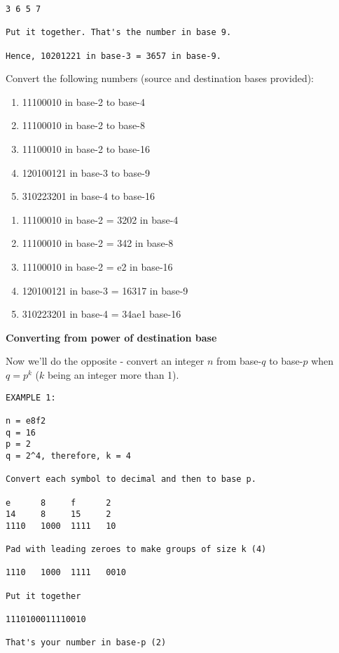 \begin{questions}
\begin{verbatim}
3 6 5 7

Put it together. That's the number in base 9.

Hence, 10201221 in base-3 = 3657 in base-9.
\end{verbatim}


Convert the following numbers (source and destination bases provided):

\begin{enumerate}
\item 11100010 in base-2 to base-4	
\item 11100010 in base-2 to base-8
\item 11100010 in base-2 to base-16	
\item 120100121 in base-3 to base-9
\item 310223201 in base-4 to base-16
\end{enumerate}

\begin{solution}
\begin{enumerate}
\item 11100010 in base-2 = 3202 in base-4	
\item 11100010 in base-2 = 342 in base-8
\item 11100010 in base-2 = e2 in base-16	
\item 120100121 in base-3 = 16317 in base-9
\item 310223201 in base-4 = 34ae1 base-16
\end{enumerate}	
\end{solution}

\question \textbf{Converting from power of destination base}
\vskip 0.5cm

Now we'll do the opposite - convert an integer $n$ from base-$q$ to base-$p$ when $q = p^k$ ($k$ being an integer more than 1).

\begin{verbatim}
EXAMPLE 1:

n = e8f2
q = 16
p = 2
q = 2^4, therefore, k = 4

Convert each symbol to decimal and then to base p.

e      8     f      2
14     8     15     2
1110   1000  1111   10

Pad with leading zeroes to make groups of size k (4)

1110   1000  1111   0010

Put it together

1110100011110010

That's your number in base-p (2)


\end{verbatim}
\end{questions}
